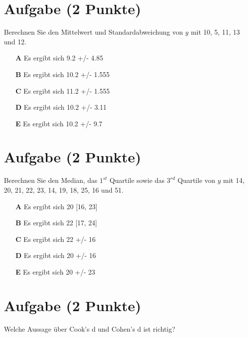 \documentclass[a4paper, 10pt]{scrartcl}\usepackage[]{graphicx}\usepackage[]{xcolor}
\begin{document}
\section{Aufgabe \hfill (2 Punkte)}




Berechnen Sie den Mittelwert und Standardabweichung von $y$ mit 10, 5, 11, 13 und 12.



\begin{enumerate}
\item [\textbf{A} \msquare] Es ergibt sich 9.2 +/- 4.85
\item [\textbf{B} \msquare] Es ergibt sich 10.2 +/- 1.555
\item [\textbf{C} \msquare] Es ergibt sich 11.2 +/- 1.555
\item [\textbf{D} \msquare] Es ergibt sich 10.2 +/- 3.11
\item [\textbf{E} \msquare] Es ergibt sich 10.2 +/- 9.7
\end{enumerate} 

\section{Aufgabe \hfill (2 Punkte)}




Berechnen Sie den Median, das $1^{st}$ Quartile sowie das $3^{rd}$ Quartile von $y$ mit 14, 20, 21, 22, 23, 14, 19, 18, 25, 16 und 51.



\begin{enumerate}
\item [\textbf{A} \msquare] Es ergibt sich 20 [16, 23]
\item [\textbf{B} \msquare] Es ergibt sich 22 [17, 24]
\item [\textbf{C} \msquare] Es ergibt sich 22 +/- 16
\item [\textbf{D} \msquare] Es ergibt sich 20 +/- 16
\item [\textbf{E} \msquare] Es ergibt sich 20 +/- 23
\end{enumerate} 

\section{Aufgabe \hfill (2 Punkte)}

Welche Aussage {\"u}ber Cook's d und Cohen's d ist richtig? 
\end{document}
